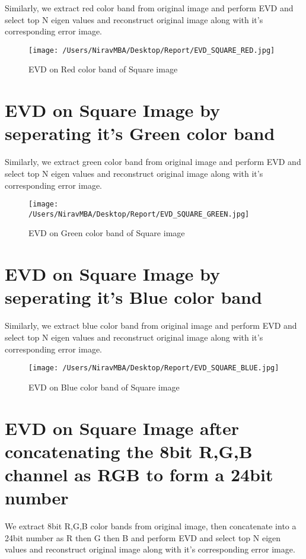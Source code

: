 \documentclass[12pt]{report}
\begin{document}
Similarly, we extract red color band from original image and perform EVD and select top N eigen values and reconstruct original image along with it's corresponding error image.\\

\begin{figure}[H]
	
	\texttt{[image: /Users/NiravMBA/Desktop/Report/EVD\_SQUARE\_RED.jpg]}
	\caption{EVD on Red color band of Square image}
\end{figure}
\cleardoublepage
\section{EVD on Square Image by seperating it's Green color band}
Similarly, we extract green color band from original image and perform EVD and select top N eigen values and reconstruct original image along with it's corresponding error image.\\

\begin{figure}[H]
	
	\texttt{[image: /Users/NiravMBA/Desktop/Report/EVD\_SQUARE\_GREEN.jpg]}
	\caption{EVD on Green color band of Square image}
\end{figure}
\cleardoublepage
\section{EVD on Square Image by seperating it's Blue color band}
Similarly, we extract blue color band from original image and perform EVD and select top N eigen values and reconstruct original image along with it's corresponding error image.\\

\begin{figure}[H]
	
	\texttt{[image: /Users/NiravMBA/Desktop/Report/EVD\_SQUARE\_BLUE.jpg]}
	\caption{EVD on Blue color band of Square image}
\end{figure}
\cleardoublepage


\section{EVD on Square Image after concatenating the 8bit R,G,B channel as RGB to form a 24bit number }

We extract 8bit R,G,B color bands from original image, then concatenate into a 24bit number as R then G then B and perform EVD and select top N eigen values and reconstruct original image along with it's corresponding error image.\\
\end{document}
